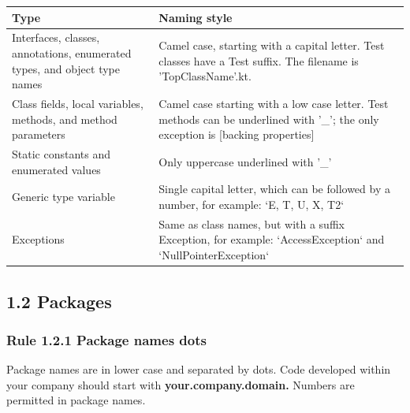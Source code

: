 {{{{{{{{{{{{\begin{center}

\begin{tabular}{ |p{7.5cm}|p{7.5cm}| }

\hline

Type&Naming style\\

\hline

 Interfaces, classes, annotations, enumerated types, and object type names & Camel case, starting with a capital letter. Test classes have a Test suffix. The filename is 'TopClassName'.kt.  \\

 Class fields, local variables, methods, and method parameters & Camel case starting with a low case letter. Test methods can be underlined with '\_'; the only exception is [backing properties]\\

 Static constants and enumerated values & Only uppercase underlined with '\_' \\

 Generic type variable & Single capital letter, which can be followed by a number, for example: `E, T, U, X, T2` \\

 Exceptions & Same as class names, but with a suffix Exception, for example: `AccessException` and `NullPointerException`\\

\hline

\end{tabular}

\end{center}

\subsection*{\textbf{1.2 Packages}}

\label{sec:1.2}



\subsubsection*{\textbf{Rule 1.2.1 Package names dots}}
\leavevmode\newline


Package names are in lower case and separated by dots. Code developed within your company should start with \textbf{your.company.domain.} Numbers are permitted in package names.

}}}}}}}}}}}}
